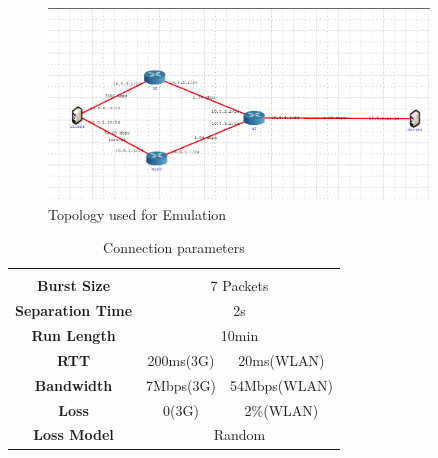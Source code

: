 \documentclass[12pt,draftcls,onecolumn]{IEEEtran}
\begin{document}
\begin{figure}[!ht]
\begin{center}
\includegraphics[angle=0, width=0.9\textwidth]{images/fortest.ps}
\caption{Topology used for Emulation}\label{fig1}
\end{center}
\label{prl}
\end{figure}
\begin{center}
\begin{table}
\begin{center}
\begin{tabular}{|c|cccccccccc|}
      \hline
      \multicolumn{1}{c}{} & & \\[\dimexpr-\normalbaselineskip-\arrayrulewidth]
      \textbf{Burst Size} & \multicolumn{10}{c|}{7 Packets} \\
      \hline
      \textbf{Separation Time} & \multicolumn{10}{c|}{2s} \\
      \hline

      \textbf{Run Length} & \multicolumn{10}{c|}{10min}\\
      \hline 	
      \textbf{RTT} & \multicolumn{5}{c|}{200ms(3G)} & \multicolumn{5}{c|}{20ms(WLAN)} \\
      \hline 	
      \textbf{Bandwidth} & \multicolumn{5}{c|}{7Mbps(3G)} & \multicolumn{5}{c|}{54Mbps(WLAN)} \\
      \hline
      \textbf{Loss} & \multicolumn{5}{c|}{0(3G)} & \multicolumn{5}{c|}{2\%(WLAN)} \\
      \hline
      \textbf{Loss Model} & \multicolumn{10}{c|}{Random}\\
      \hline
\end{tabular}
\caption{Connection parameters}\label{tab1}
\end{center}
\end{table}
\end{center}
\end{document}
